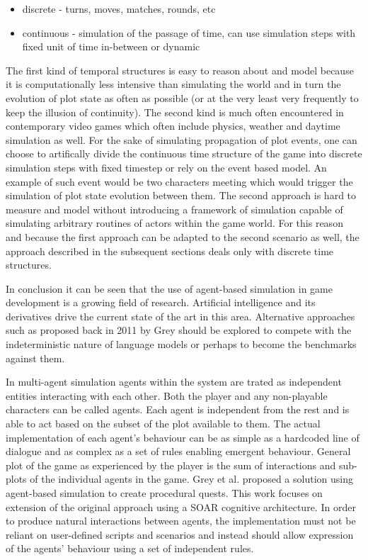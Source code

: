 \begin{itemize}
    \item discrete - turns, moves, matches, rounds, etc
    \item continuous - simulation of the passage of time, can use simulation steps with fixed unit of time in-between or dynamic
\end{itemize}

The first kind of temporal structures is easy to reason about and model because it is computationally less intensive than simulating the world and in turn the evolution of plot state as often as possible (or at the very least very frequently to keep the illusion of continuity).
The second kind is much often encountered in contemporary video games which often include physics, weather and daytime simulation as well.
For the sake of simulating propagation of plot events, one can choose to artifically divide the continuous time structure of the game into discrete simulation steps with fixed timestep or rely on the event based model.
An example of such event would be two characters meeting which would trigger the simulation of plot state evolution between them.
The second approach is hard to measure and model without introducing a framework of simulation capable of simulating arbitrary routines of actors within the game world.
For this reason and because the first approach can be adapted to the second scenario as well, the approach described in the subsequent sections deals only with discrete time structures.

In conclusion it can be seen that the use of agent-based simulation in game development is a growing field of research.
Artificial intelligence and its derivatives drive the current state of the art in this area.
Alternative approaches such as proposed back in 2011 by Grey\cite{grey2011procedural} should be explored to compete with the indeterministic nature of language models or perhaps to become the benchmarks against them.

In multi-agent simulation agents within the system are trated as independent entities interacting with each other.
Both the player and any non-playable characters can be called agents.
Each agent is independent from the rest and is able to act based on the subset of the plot available to them.
The actual implementation of each agent's behaviour can be as simple as a hardcoded line of dialogue and as complex as a set of rules enabling emergent behaviour.
General plot of the game as experienced by the player is the sum of interactions and sub-plots of the individual agents in the game.
Grey et al.\cite{grey2011procedural} proposed a solution using agent-based simulation to create procedural quests.
This work focuses on extension of the original approach using a SOAR cognitive architecture\cite{rosenbloom1993soar}.
In order to produce natural interactions between agents, the implementation must not be reliant on user-defined scripts and scenarios and instead should allow expression of the agents' behaviour using a set of independent rules.

